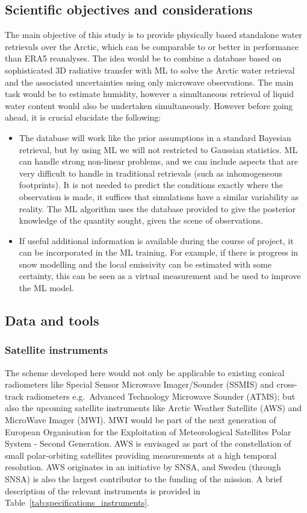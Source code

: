 \documentclass[12pt,oneside,a4paper]{article}
\begin{document}
\subsection{Scientific objectives and considerations}
The main objective of this study is to provide physically based standalone water retrievals over the Arctic, which can be comparable to or better in performance than ERA5 reanalyses. The idea would be to combine a database based on sophisticated 3D radiative transfer with ML to solve the Arctic water retrieval and the associated uncertainties using only microwave observations. The main task would be to estimate humidity, however a simultaneous retrieval of liquid water content would also be undertaken simultaneously.
However before going ahead, it is crucial elucidate the following:
\begin{itemize}
\item The database will work like the prior assumptions in a standard Bayesian retrieval, but by using ML we will not restricted to Gaussian statistics. ML can handle strong non-linear problems, and we can include aspects that are very difficult to handle in traditional retrievals (such as inhomogeneous footprints). It is not needed to predict the conditions exactly where the observation is made, it suffices that simulations have a similar variability as reality. The ML algorithm uses the database provided to give the posterior knowledge of the quantity sought, given the scene of observations.
\item If useful additional information is available during the course of project, it can be incorporated in the ML training. For example, if there is progress in snow modelling and the local emissivity can be estimated with some certainty, this can be seen as a virtual measurement and be used to improve the ML model. 
\end{itemize}

\subsection{Data and tools}
% 
\subsubsection{Satellite instruments}

The scheme developed here would not only be applicable to existing conical radiometers like  Special Sensor Microwave Imager/Sounder (SSMIS) and cross-track radiometers e.g.\, Advanced Technology Microwave Sounder (ATMS); but also the upcoming satellite instruments like Arctic Weather Satellite (AWS) and MicroWave Imager (MWI). MWI would be part of the next generation of European Organisation for the Exploitation of Meteorological Satellites Polar System - Second Generation. AWS is envisaged as part of the constellation of small polar-orbiting satellites providing measurements at a high temporal resolution. AWS originates in an initiative by SNSA, and Sweden (through SNSA) is also the largest contributor to the funding of the mission. A brief description of the relevant instruments is provided in Table~\ref{tab:specifications_instruments}. 
\end{document}
